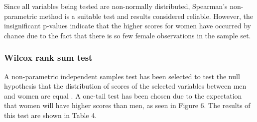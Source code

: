 Since all variables being tested are non-normally distributed, Spearman's non-parametric method is a suitable test and results considered reliable. However, the insignificant p-values indicate that the higher scores for women have occurred by chance due to the fact that there is so few female observations in the sample set.



\subsubsection{Wilcox rank sum test}


A non-parametric independent samples test has been selected to test the null hypothesis that the distribution of scores of the selected variables between men and women are equal \citep{Coolican2014}. A one-tail test has been chosen due to the expectation that women will have higher scores than men, as seen in Figure 6. The results of this test are shown in Table 4. 

